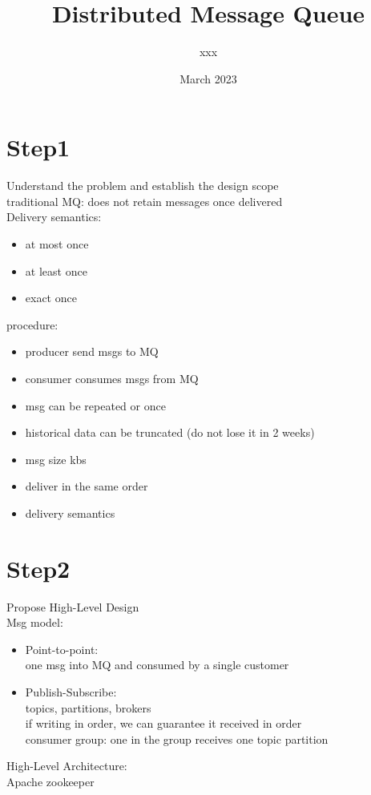 \documentclass{article}
\title{Distributed Message Queue}
\author{xxx}
\date{March 2023}
\begin{document}
\maketitle

\section{Step1}
Understand the problem and establish the design scope\\
traditional MQ: does not retain messages once delivered\\
Delivery semantics:\\
\begin{itemize}
    \item at most once
    \item at least once
    \item exact once
\end{itemize}
procedure:\\
\begin{itemize}
    \item producer send msgs to MQ
    \item consumer consumes msgs from MQ
    \item msg can be repeated or once
    \item historical data can be truncated (do not lose it in 2 weeks)
    \item msg size kbs
    \item deliver in the same order
    \item delivery semantics
\end{itemize}
\section{Step2}
Propose High-Level Design\\
Msg model:\\
\begin{itemize}
    \item Point-to-point:\\
    one msg into MQ and consumed by a single customer
    \item Publish-Subscribe:\\
    topics, partitions, brokers\\
    if writing in order, we can guarantee it received in order\\
    consumer group: one in the group receives one topic partition
\end{itemize}
High-Level Architecture:\\
Apache zookeeper\\
\end{document}
